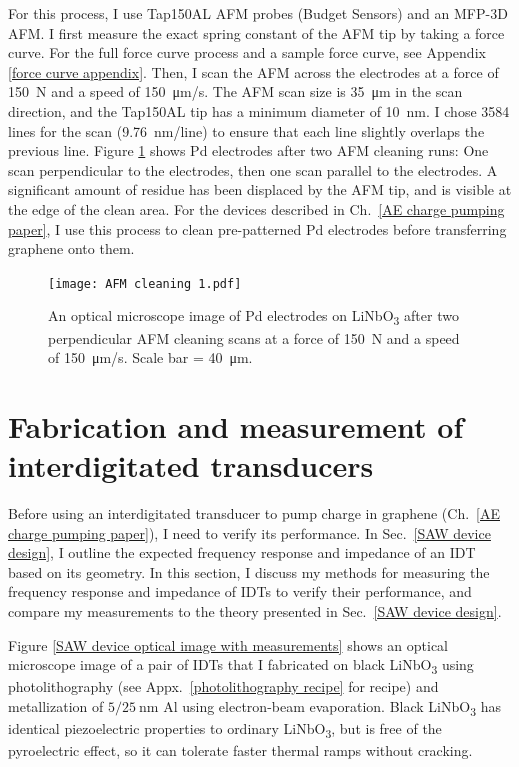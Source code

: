 \documentclass[double,12pt,1in,seploa]{beavtex}
\let\Oldsection\section
\renewcommand{\section}{\FloatBarrier\Oldsection}
\begin{document}
For this process, I use Tap150AL AFM probes (Budget Sensors) and an MFP-3D AFM. I first measure the exact spring constant of the AFM tip by taking a force curve. For the full force curve process and a sample force curve, see Appendix \ref{force curve appendix}. Then, I scan the AFM across the electrodes at a force of \SI{150}{N} and a speed of \SI{150}{\micro\meter/\second}. The AFM scan size is \SI{35}{\micro\meter} in the scan direction, and the Tap150AL tip has a minimum diameter of \SI{10}{\nano\meter}. I chose 3584 lines for the scan (\SI{9.76}{\nano\meter/line}) to ensure that each line slightly overlaps the previous line. Figure \ref{AFM cleaning points} shows Pd electrodes after two AFM cleaning runs: One scan perpendicular to the electrodes, then one scan parallel to the electrodes. A significant amount of residue has been displaced by the AFM tip, and is visible at the edge of the clean area. For the devices described in Ch.\ \ref{AE charge pumping paper}, I use this process to clean pre-patterned Pd electrodes before transferring graphene onto them.

\begin{figure}
    \texttt{[image: AFM cleaning 1.pdf]}
    \caption{An optical microscope image of Pd electrodes on LiNbO\textsubscript{3} after two perpendicular AFM cleaning scans at a force of \SI{150}{N} and a speed of \SI{150}{\micro\meter/\second}. Scale bar = \SI{40}{\micro\meter}.}
    \label{AFM cleaning points}
\end{figure}


\section{Fabrication and measurement of interdigitated transducers} \label{IDT methods}

Before using an interdigitated transducer to pump charge in graphene (Ch.\ \ref{AE charge pumping paper}), I need to verify its performance. In Sec.\ \ref{SAW device design}, I outline the expected frequency response and impedance of an IDT based on its geometry. In this section, I discuss my methods for measuring the frequency response and impedance of IDTs to verify their performance, and compare my measurements to the theory presented in Sec.\ \ref{SAW device design}.

Figure \ref{SAW device optical image with measurements} shows an optical microscope image of a pair of IDTs that I fabricated on black LiNbO\textsubscript{3} using photolithography (see Appx.\ \ref{photolithography recipe} for recipe) and metallization of $5/\SI{25}{\nano\meter}$ Al using electron-beam evaporation. Black LiNbO\textsubscript{3} has identical piezoelectric properties to ordinary LiNbO\textsubscript{3}, but is free of the pyroelectric effect, so it can tolerate faster thermal ramps without cracking.
\end{document}
